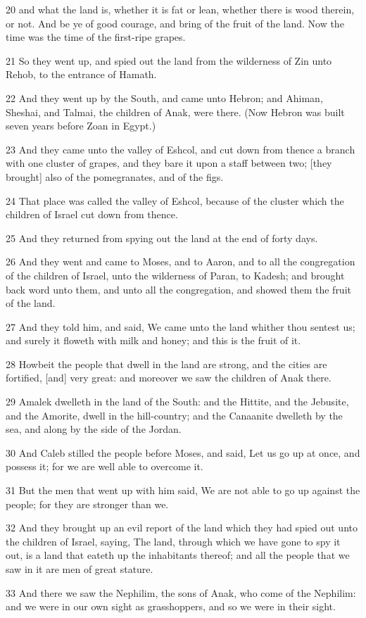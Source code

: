 \par 20 and what the land is, whether it is fat or lean, whether there is wood therein, or not. And be ye of good courage, and bring of the fruit of the land. Now the time was the time of the first-ripe grapes.
\par 21 So they went up, and spied out the land from the wilderness of Zin unto Rehob, to the entrance of Hamath.
\par 22 And they went up by the South, and came unto Hebron; and Ahiman, Sheshai, and Talmai, the children of Anak, were there. (Now Hebron was built seven years before Zoan in Egypt.)
\par 23 And they came unto the valley of Eshcol, and cut down from thence a branch with one cluster of grapes, and they bare it upon a staff between two; [they brought] also of the pomegranates, and of the figs.
\par 24 That place was called the valley of Eshcol, because of the cluster which the children of Israel cut down from thence.
\par 25 And they returned from spying out the land at the end of forty days.
\par 26 And they went and came to Moses, and to Aaron, and to all the congregation of the children of Israel, unto the wilderness of Paran, to Kadesh; and brought back word unto them, and unto all the congregation, and showed them the fruit of the land.
\par 27 And they told him, and said, We came unto the land whither thou sentest us; and surely it floweth with milk and honey; and this is the fruit of it.
\par 28 Howbeit the people that dwell in the land are strong, and the cities are fortified, [and] very great: and moreover we saw the children of Anak there.
\par 29 Amalek dwelleth in the land of the South: and the Hittite, and the Jebusite, and the Amorite, dwell in the hill-country; and the Canaanite dwelleth by the sea, and along by the side of the Jordan.
\par 30 And Caleb stilled the people before Moses, and said, Let us go up at once, and possess it; for we are well able to overcome it.
\par 31 But the men that went up with him said, We are not able to go up against the people; for they are stronger than we.
\par 32 And they brought up an evil report of the land which they had spied out unto the children of Israel, saying, The land, through which we have gone to spy it out, is a land that eateth up the inhabitants thereof; and all the people that we saw in it are men of great stature.
\par 33 And there we saw the Nephilim, the sons of Anak, who come of the Nephilim: and we were in our own sight as grasshoppers, and so we were in their sight.

